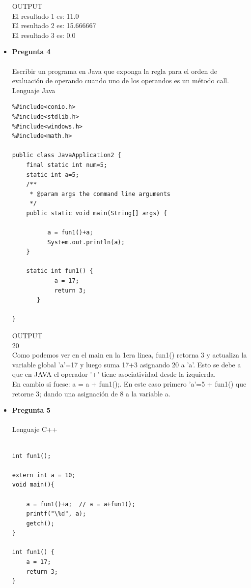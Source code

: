\documentclass[12pt,oneside]{article}
\begin{document}
\begin{itemize}
OUTPUT\\
El resultado 1 es: 11.0\\
El resultado 2 es: 15.666667\\
El resultado 3 es: 0.0\\


\item {\bf Pregunta 4} \\\\
Escribir un programa en Java que exponga la regla para el orden de evaluación de operando cuando uno de los operandos es un método call.\\
Lenguaje Java\\
\begin{lstlisting}[frame=single]  % Start your code-block
%# include<stdio.h>
%#include<conio.h>
%#include<stdlib.h>
%#include<windows.h>
%#include<math.h>

public class JavaApplication2 {
    final static int num=5;
    static int a=5;
    /**
     * @param args the command line arguments
     */
    public static void main(String[] args) {
        
          a = fun1()+a; 
          System.out.println(a); 
    }

    static int fun1() {
            a = 17;
            return 3;
       }

}

\end{lstlisting}
OUTPUT\\
20\\
Como podemos ver en el main en la 1era linea, fun1() retorna 3 y actualiza la variable global 'a'=17 y luego suma 17+3 asignando 20 a 'a'. Esto se debe a que en JAVA el operador '+' tiene asociatividad desde la izquierda.\\
En cambio si fuese:  a = a + fun1();. En este caso primero 'a'=5 + fun1() que retorne 3; dando una asignación de 8 a la variable a.

\item {\bf Pregunta 5} \\\\

Lenguaje C++
\begin{lstlisting}[frame=single]  % Start your code-block

int fun1();

extern int a = 10;
void main(){
	
	a = fun1()+a;  // a = a+fun1();
	printf("\%d", a);
	getch();
}

int fun1() {
	a = 17;
	return 3;
}
\end{lstlisting}


\end{itemize}
\end{document}
